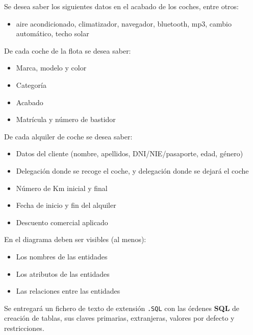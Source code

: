 Se desea saber los siguientes datos en el acabado de los coches, entre otros:
\begin{itemize}
\item aire acondicionado, climatizador, navegador, bluetooth, mp3, cambio automático, techo solar
\end{itemize}

De cada coche de la flota se desea saber:
\begin{itemize}
\item Marca, modelo y color
\item Categoría
\item Acabado
\item Matrícula y número de bastidor
\end{itemize}

De cada alquiler de coche se desea saber:
\begin{itemize}
\item Datos del cliente (nombre, apellidos, DNI/NIE/pasaporte, edad,
  género)
\item  Delegación donde se recoge el coche, y delegación donde se
  dejará el coche
\item  Número de Km inicial y final
\item  Fecha de inicio y fin del alquiler
\item  Descuento comercial aplicado
\end{itemize}


\begin{homeworkProblem}
  En el diagrama deben ser visibles (al menos):
  \begin{itemize}
  \item Los nombres de las entidades
  \item Los atributos de las entidades
  \item Las relaciones entre las entidades
  \end{itemize}

\end{homeworkProblem}


\begin{homeworkProblem}
  Se entregará un fichero de texto de extensión \texttt{.SQL} con las órdenes \textbf{SQL} de creación de tablas, sus claves primarias, extranjeras, valores por defecto y restricciones.

\end{homeworkProblem}



